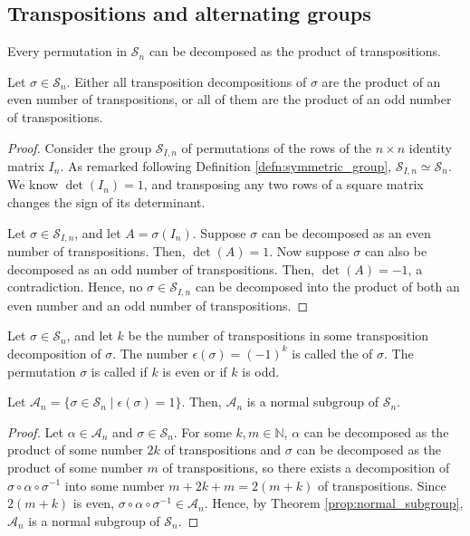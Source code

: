 \subsection*{Transpositions and alternating groups}

\begin{cor}
Every permutation in $ \mathcal{S}_n $ can be decomposed as the product of transpositions.
\end{cor}

\begin{prop}
Let $ \sigma\in\mathcal{S}_n $. Either all transposition decompositions of $ \sigma $ are the product of an even number of transpositions, or all of them are the product of an odd number of transpositions.
\end{prop}
\begin{proof}
Consider the group $ \mathcal{S}_{I,n} $ of permutations of the rows of the $ n\times n $ identity matrix $ I_n $. As remarked following Definition \ref{defn:symmetric_group}, $ \mathcal{S}_{I,n}\simeq\mathcal{S}_n $. We know $ \det(I_n)=1 $, and transposing any two rows of a square matrix changes the sign of its determinant.

Let $ \sigma\in\mathcal{S}_{I,n} $, and let $ A=\sigma(I_n) $. Suppose $ \sigma $ can be decomposed as an even number of transpositions. Then, $ \det(A)=1 $. Now suppose $ \sigma $ can also be decomposed as an odd number of transpositions. Then, $ \det(A)=-1 $, a contradiction. Hence, no $ \sigma\in\mathcal{S}_{I,n} $ can be decomposed into the product of both an even number and an odd number of transpositions.
\end{proof}

\begin{defn}
Let $ \sigma\in\mathcal{S}_n $, and let $ k $ be the number of transpositions in some transposition decomposition of $ \sigma $. The number $ \epsilon(\sigma)=(-1)^k $ is called the  of $ \sigma $. The permutation $ \sigma $ is called  if $ k $ is even or  if $ k $ is odd.
\end{defn}

\begin{prop}\label{prop:alternating_group}
Let $ \mathcal{A}_n=\{\sigma\in\mathcal{S}_n\mid\epsilon(\sigma)=1\} $. Then, $ \mathcal{A}_n $ is a normal subgroup of $ \mathcal{S}_n $.
\end{prop}
\begin{proof}
Let $ \alpha\in\mathcal{A}_n $ and $ \sigma\in\mathcal{S}_n $. For some $ k,m\in\mathbb{N} $, $ \alpha $ can be decomposed as the product of some number $ 2k $ of transpositions and $ \sigma $ can be decomposed as the product of some number $ m $ of transpositions, so there exists a decomposition of $ \sigma\circ\alpha\circ\sigma^{-1} $ into some number $ m+2k+m=2(m+k) $ of transpositions. Since $ 2(m+k) $ is even, $ \sigma\circ\alpha\circ\sigma^{-1}\in\mathcal{A}_n $. Hence, by Theorem \ref{prop:normal_subgroup}, $ \mathcal{A}_n $ is a normal subgroup of $ \mathcal{S}_n $.
\end{proof}

